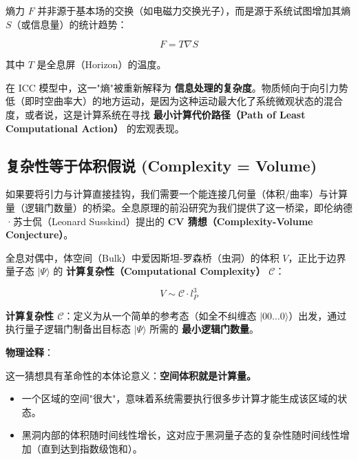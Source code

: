 \begin{definition}[熵力]
熵力 $F$ 并非源于基本场的交换（如电磁力交换光子），而是源于系统试图增加其熵 $S$（或信息量）的统计趋势：

\begin{equation}
F = T \nabla S
\end{equation}

其中 $T$ 是全息屏（Horizon）的温度。
\end{definition}

在 ICC 模型中，这一"熵"被重新解释为 \textbf{信息处理的复杂度}。物质倾向于向引力势低（即时空曲率大）的地方运动，是因为这种运动最大化了系统微观状态的混合度，或者说，这是计算系统在寻找 \textbf{最小计算代价路径（Path of Least Computational Action）} 的宏观表现。

\subsection{复杂性等于体积假说 (Complexity = Volume)}

如果要将引力与计算直接挂钩，我们需要一个能连接几何量（体积/曲率）与计算量（逻辑门数量）的桥梁。全息原理的前沿研究为我们提供了这一桥梁，即伦纳德·苏士侃（Leonard Susskind）提出的 \textbf{CV 猜想（Complexity-Volume Conjecture）}。

\begin{conjecture}[CV 对应]
全息对偶中，体空间（Bulk）中爱因斯坦-罗森桥（虫洞）的体积 $V$，正比于边界量子态 $|\Psi\rangle$ 的 \textbf{计算复杂性（Computational Complexity）} $\mathcal{C}$：

\begin{equation}
V \sim \mathcal{C} \cdot l_P^3
\end{equation}

\textbf{计算复杂性 $\mathcal{C}$}：定义为从一个简单的参考态（如全不纠缠态 $|00\dots0\rangle$）出发，通过执行量子逻辑门制备出目标态 $|\Psi\rangle$ 所需的 \textbf{最小逻辑门数量}。
\end{conjecture}

\textbf{物理诠释}：

这一猜想具有革命性的本体论意义：\textbf{空间体积就是计算量。}

\begin{itemize}
\item 一个区域的空间"很大"，意味着系统需要执行很多步计算才能生成该区域的状态。

\item 黑洞内部的体积随时间线性增长，这对应于黑洞量子态的复杂性随时间线性增加（直到达到指数级饱和）。
\end{itemize}

